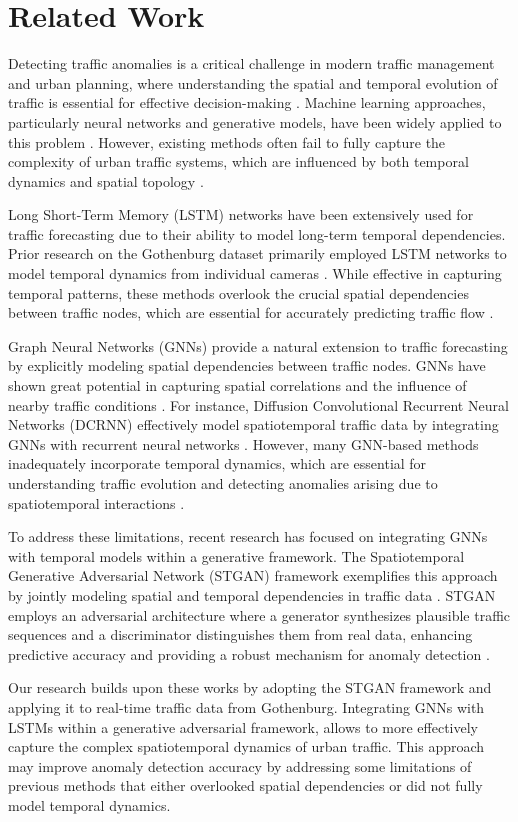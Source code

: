 \section{Related Work}
\label{SOTASection}

Detecting traffic anomalies is a critical challenge in modern traffic management and urban planning, where understanding the spatial and temporal evolution of traffic is essential for effective decision-making \cite{Patil2022}. Machine learning approaches, particularly neural networks and generative models, have been widely applied to this problem \cite{Sakurada2015, Wang2019, norlander2019latent, astrom2024improved}. However, existing methods often fail to fully capture the complexity of urban traffic systems, which are influenced by both temporal dynamics and spatial topology \cite{Zhang2022}.

Long Short-Term Memory (LSTM) networks \cite{Hochreiter1997} have been extensively used for traffic forecasting due to their ability to model long-term temporal dependencies. Prior research on the Gothenburg dataset primarily employed LSTM networks to model temporal dynamics from individual cameras \cite{Sopasakis2019}. While effective in capturing temporal patterns, these methods overlook the crucial spatial dependencies between traffic nodes, which are essential for accurately predicting traffic flow \cite{Yu2018, Li2018}.

Graph Neural Networks (GNNs) provide a natural extension to traffic forecasting by explicitly modeling spatial dependencies between traffic nodes. GNNs have shown great potential in capturing spatial correlations and the influence of nearby traffic conditions \cite{Wu2020, Zhang2022}. For instance, Diffusion Convolutional Recurrent Neural Networks (DCRNN) effectively model spatiotemporal traffic data by integrating GNNs with recurrent neural networks \cite{Li2018, Yu2018}. However, many GNN-based methods inadequately incorporate temporal dynamics, which are essential for understanding traffic evolution and detecting anomalies arising due to spatiotemporal interactions \cite{Zhou2020}.

To address these limitations, recent research has focused on integrating GNNs with temporal models within a generative framework. The Spatiotemporal Generative Adversarial Network (STGAN) framework exemplifies this approach by jointly modeling spatial and temporal dependencies in traffic data \cite{Deng2022}. STGAN employs an adversarial architecture \cite{Wang2021} where a generator synthesizes plausible traffic sequences and a discriminator distinguishes them from real data, enhancing predictive accuracy and providing a robust mechanism for anomaly detection \cite{Goodfellow2014, Zhang2022}.

Our research builds upon these works by adopting the STGAN framework and applying it to real-time traffic data from Gothenburg. Integrating GNNs with LSTMs within a generative adversarial framework, allows to more effectively capture the complex spatiotemporal dynamics of urban traffic. This approach may improve anomaly detection accuracy by addressing some limitations of previous methods that either overlooked spatial dependencies or did not fully model temporal dynamics.